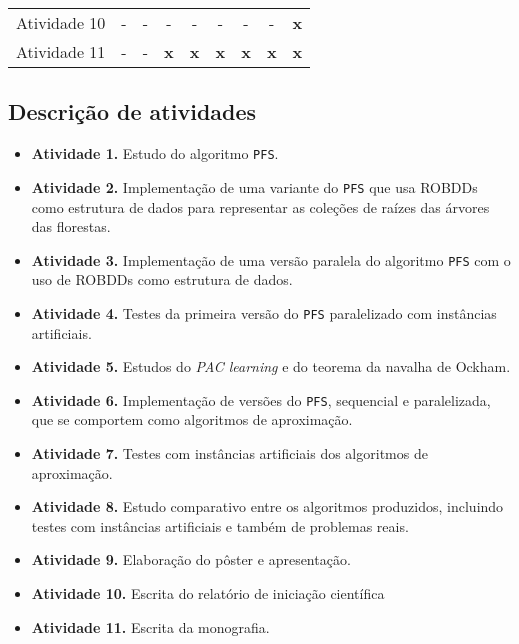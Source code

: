 \documentclass[12pt]{article}
\begin{document}
\begin{table}[!ht]
\begin{center}
\begin{tabular}{l  cccccccc}
    \small Atividade 10
    & \small - & \small - & \small - & \small - & \small -  
    & \small - & \small - & \small {\bf x} \\

    \small Atividade 11
    & \small - & \small - & \small {\bf x} & \small {\bf x} 
    & \small {\bf x}  & \small {\bf x} & \small {\bf x}
    & \small {\bf x} \\



    \bottomrule
\end{tabular}
\end{center}
\end{table}

\subsection{Descrição de atividades} \label{sec:atividades}
\begin{itemize}
    \item{\bf Atividade 1.}
        Estudo do algoritmo {\tt PFS}.
    \item{\bf Atividade 2.}
        Implementação de uma variante do {\tt PFS} que usa ROBDDs como 
        estrutura de dados para representar as coleções de raízes das 
        árvores das florestas.
    \item{\bf Atividade 3.}
        Implementação de uma versão paralela do algoritmo {\tt PFS} com
        o uso de ROBDDs como estrutura de dados.
    \item{\bf Atividade 4.}
        Testes da primeira versão do {\tt PFS} paralelizado com 
        instâncias artificiais.
    \item{\bf Atividade 5.}
        Estudos do {\em PAC learning} e do teorema da navalha de Ockham.
    \item{\bf Atividade 6.}
        Implementação de versões do {\tt PFS}, sequencial e 
        paralelizada, que se comportem como algoritmos de aproximação.
    \item{\bf Atividade 7.} 
        Testes com instâncias artificiais dos algoritmos de aproximação.
    \item{\bf Atividade 8.}
        Estudo comparativo entre os algoritmos produzidos, incluindo 
        testes com instâncias artificiais e também de problemas reais.
    \item{\bf Atividade 9.}
        Elaboração do pôster e apresentação.
    \item{\bf Atividade 10.}
        Escrita do relatório de iniciação científica
    \item{\bf Atividade 11.}
        Escrita da monografia.
    \end{itemize}
\end{document}
